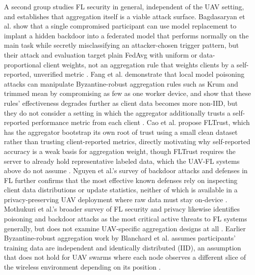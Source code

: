 \documentclass[journal]{IEEEtran}
\begin{document}
A second group studies FL security in general, independent of the UAV setting, and establishes that aggregation itself is a viable attack surface. Bagdasaryan et al. show that a single compromised participant can use model replacement to implant a hidden backdoor into a federated model that performs normally on the main task while secretly misclassifying an attacker-chosen trigger pattern, but their attack and evaluation target plain FedAvg with uniform or data-proportional client weights, not an aggregation rule that weights clients by a self-reported, unverified metric \cite{bagdasaryan2020backdoor}. Fang et al. demonstrate that local model poisoning attacks can manipulate Byzantine-robust aggregation rules such as Krum and trimmed mean by compromising as few as one worker device, and show that these rules' effectiveness degrades further as client data becomes more non-IID, but they do not consider a setting in which the aggregator additionally trusts a self-reported performance metric from each client \cite{fang2020local}. Cao et al. propose FLTrust, which has the aggregator bootstrap its own root of trust using a small clean dataset rather than trusting client-reported metrics, directly motivating why self-reported accuracy is a weak basis for aggregation weight, though FLTrust requires the server to already hold representative labeled data, which the UAV-FL systems above do not assume \cite{cao2021fltrust}. Nguyen et al.'s survey of backdoor attacks and defenses in FL further confirms that the most effective known defenses rely on inspecting client data distributions or update statistics, neither of which is available in a privacy-preserving UAV deployment where raw data must stay on-device \cite{nguyen2024backdoor}. Mothukuri et al.'s broader survey of FL security and privacy likewise identifies poisoning and backdoor attacks as the most critical active threats to FL systems generally, but does not examine UAV-specific aggregation designs at all \cite{mothukuri2021survey}. Earlier Byzantine-robust aggregation work by Blanchard et al. assumes participants' training data are independent and identically distributed (IID), an assumption that does not hold for UAV swarms where each node observes a different slice of the wireless environment depending on its position \cite{blanchard2017machine}.
\end{document}
